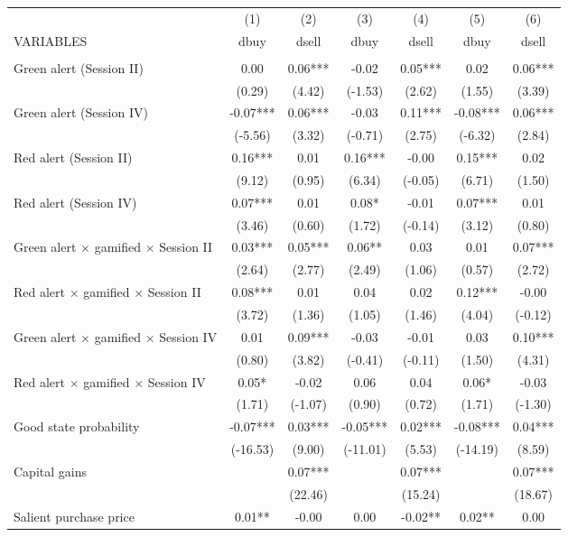 \documentclass[]{article}
\begin{document}
\begin{tabular}{lcccccc} \hline
 & (1) & (2) & (3) & (4) & (5) & (6) \\
VARIABLES & dbuy & dsell & dbuy & dsell & dbuy & dsell \\ \hline
 &  &  &  &  &  &  \\
Green alert (Session II) & 0.00 & 0.06*** & -0.02 & 0.05*** & 0.02 & 0.06*** \\
 & (0.29) & (4.42) & (-1.53) & (2.62) & (1.55) & (3.39) \\
Green alert (Session IV) & -0.07*** & 0.06*** & -0.03 & 0.11*** & -0.08*** & 0.06*** \\
 & (-5.56) & (3.32) & (-0.71) & (2.75) & (-6.32) & (2.84) \\
Red alert (Session II) & 0.16*** & 0.01 & 0.16*** & -0.00 & 0.15*** & 0.02 \\
 & (9.12) & (0.95) & (6.34) & (-0.05) & (6.71) & (1.50) \\
Red alert (Session IV) & 0.07*** & 0.01 & 0.08* & -0.01 & 0.07*** & 0.01 \\
 & (3.46) & (0.60) & (1.72) & (-0.14) & (3.12) & (0.80) \\
Green alert $\times$ gamified $\times$ Session II & 0.03*** & 0.05*** & 0.06** & 0.03 & 0.01 & 0.07*** \\
 & (2.64) & (2.77) & (2.49) & (1.06) & (0.57) & (2.72) \\
Red alert $\times$ gamified $\times$ Session II & 0.08*** & 0.01 & 0.04 & 0.02 & 0.12*** & -0.00 \\
 & (3.72) & (1.36) & (1.05) & (1.46) & (4.04) & (-0.12) \\
Green alert $\times$ gamified $\times$ Session IV & 0.01 & 0.09*** & -0.03 & -0.01 & 0.03 & 0.10*** \\
 & (0.80) & (3.82) & (-0.41) & (-0.11) & (1.50) & (4.31) \\
Red alert $\times$ gamified $\times$ Session IV & 0.05* & -0.02 & 0.06 & 0.04 & 0.06* & -0.03 \\
 & (1.71) & (-1.07) & (0.90) & (0.72) & (1.71) & (-1.30) \\
Good state probability & -0.07*** & 0.03*** & -0.05*** & 0.02*** & -0.08*** & 0.04*** \\
 & (-16.53) & (9.00) & (-11.01) & (5.53) & (-14.19) & (8.59) \\
Capital gains &  & 0.07*** &  & 0.07*** &  & 0.07*** \\
 &  & (22.46) &  & (15.24) &  & (18.67) \\
Salient purchase price & 0.01** & -0.00 & 0.00 & -0.02** & 0.02** & 0.00 \\

\end{tabular}
\end{document}
